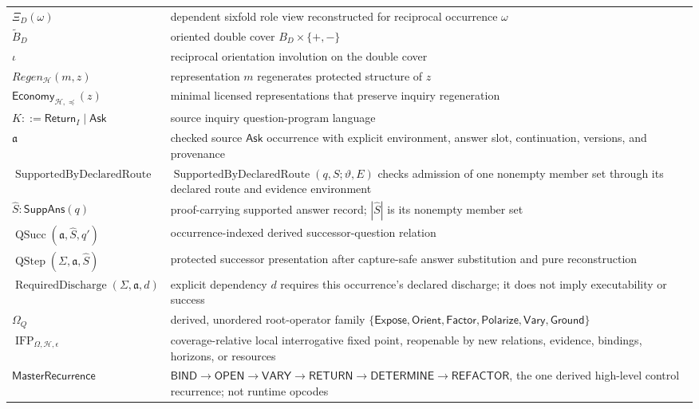 \documentclass[11pt,oneside]{article}
\newcommand{\RequiredDischarge}{\operatorname{RequiredDischarge}}
\newcommand{\QSucc}{\operatorname{QSucc}}
\newcommand{\QStep}{\operatorname{QStep}}
\newcommand{\IFP}{\operatorname{IFP}}
\newcommand{\AskRef}{\mathfrak a}
\newcommand{\SupportedRoute}{\operatorname{SupportedByDeclaredRoute}}
\begin{document}
\begin{longtable}{>{\raggedright\arraybackslash}p{}
                  >{\raggedright\arraybackslash}p{}}
\(\Xi_D(\omega)\) & dependent sixfold role view reconstructed for reciprocal occurrence \(\omega\)\\
\(\widetilde B_D\) & oriented double cover \(B_D\times\{+,-\}\)\\
\(\iota\) & reciprocal orientation involution on the double cover\\
\(Regen_{\mathcal H}(m,z)\) & representation \(m\) regenerates protected structure of \(z\)\\
\(\mathsf{Economy}_{\mathcal H,\preceq}(z)\) & minimal licensed representations that preserve inquiry regeneration\\
\(K::=\mathsf{Return}_I\mid\mathsf{Ask}\) & source inquiry question-program language\\
\(\AskRef\) & checked source \(\mathsf{Ask}\) occurrence with explicit environment, answer slot, continuation, versions, and provenance\\
\(\SupportedRoute\) & \(\SupportedRoute(q,S;\vartheta,E)\) checks admission of one nonempty member set through its declared route and evidence environment\\
\(\widehat S:\mathsf{SuppAns}(q)\) & proof-carrying supported answer record; \(|\widehat S|\) is its nonempty member set\\
\(\QSucc(\AskRef,\widehat S,q')\) & occurrence-indexed derived successor-question relation\\
\(\QStep(\Sigma,\AskRef,\widehat S)\) & protected successor presentation after capture-safe answer substitution and pure reconstruction\\
\(\RequiredDischarge(\Sigma,\AskRef,d)\) & explicit dependency \(d\) requires this occurrence's declared discharge; it does not imply executability or success\\
\(\Omega_Q\) & derived, unordered root-operator family \(\{\mathsf{Expose},\mathsf{Orient},\mathsf{Factor},\mathsf{Polarize},\mathsf{Vary},\mathsf{Ground}\}\)\\
\(\IFP_{\Omega,\mathcal H,\epsilon}\) & coverage-relative local interrogative fixed point, reopenable by new relations, evidence, bindings, horizons, or resources\\
\(\mathsf{MasterRecurrence}\) & \(\mathsf{BIND}\to\mathsf{OPEN}\to\mathsf{VARY}\to\mathsf{RETURN}\to\mathsf{DETERMINE}\to\mathsf{REFACTOR}\), the one derived high-level control recurrence; not runtime opcodes\\


\end{longtable}
\end{document}
